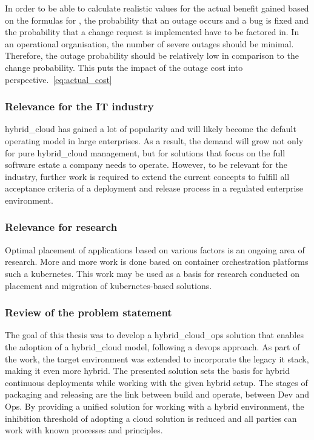 \documentclass[../main.tex]{subfiles}
\begin{document}
    

    In order to be able to calculate realistic values for the actual benefit gained based on the formulas for , the probability that an outage occurs and a bug is fixed and the probability that a change request is implemented have to be factored in.
    In an operational organisation, the number of severe outages should be minimal.
    Therefore, the outage probability should be relatively low in comparison to the change probability.
    This puts the impact of the outage cost into perspective.~\eqref{eq:actual_cost}

    

    \subsubsection{Relevance for the IT industry}

    \Gls{hybrid_cloud} has gained a lot of popularity and will likely become the default operating model in large enterprises.
    As a result, the demand will grow not only for pure \gls{hybrid_cloud} management, but for solutions that focus on the full software estate a company needs to operate.
    However, to be relevant for the industry, further work is required to extend the current concepts to fulfill all acceptance criteria of a deployment and release process in a regulated enterprise environment.

    \subsubsection{Relevance for research}

    Optimal placement of applications based on various factors is an ongoing area of research.
    More and more work is done based on container orchestration platforms such a \gls{kubernetes}.
    This work may be used as a basis for research conducted on placement and migration of \gls{kubernetes}-based solutions.

    \subsubsection{Review of the problem statement}

    The goal of this thesis was to develop a \gls{hybrid_cloud_ops} solution that enables the adoption of a \gls{hybrid_cloud} model, following a \gls{devops} approach.
    As part of the work, the target environment was extended to incorporate the legacy \acrshort{it} stack, making it even more hybrid.
    The presented solution sets the basis for hybrid continuous deployments while working with the given hybrid setup.
    The stages of packaging and releasing are the link between build and operate, between Dev and Ops.
    By providing a unified solution for working with a hybrid environment, the inhibition threshold of adopting a cloud solution is reduced and all parties can work with known processes and principles.
\end{document}
